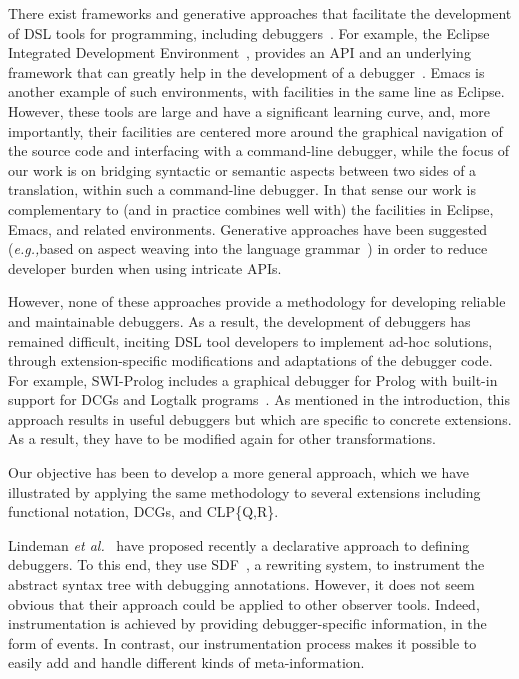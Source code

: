 \documentclass[preprint]{llncs}
\newcommand{\eg}{\emph{e.g.,\xspace}}
\begin{document}
There exist frameworks and generative approaches that facilitate the
development of DSL tools for programming, including
debuggers~\cite{eclipse,tide}. For example, the Eclipse Integrated
Development Environment~\cite{eclipse}, provides an API and an
underlying framework that can greatly help in the development of a
debugger~\cite{eclipsehowtodebug}.  Emacs 
is another example of such environments, with facilities in the same
line as
Eclipse.  However, 
these tools are large and have a significant learning curve, and, more
importantly, their facilities are centered more around the graphical
navigation of the source code and interfacing with a command-line
debugger, while the focus of our work is on bridging syntactic or
semantic aspects between two sides of a translation, within such a
command-line debugger.
In that sense our work is complementary to (and in practice combines
well with) the facilities in Eclipse, Emacs, and related environments.
Generative approaches have been suggested (\eg based on aspect weaving
into the language grammar~\cite{debugaspect05}) in order to reduce
developer burden when using intricate APIs.  

However, none of these approaches provide a methodology for developing
reliable and maintainable debuggers. As a result, the development of
debuggers has remained difficult, inciting DSL tool developers to
implement ad-hoc solutions,
through extension-specific modifications and adaptations of the
debugger code. For example, SWI-Prolog includes a graphical debugger for Prolog with built-in support for DCGs and Logtalk
programs~\cite{swipl-debug}. As mentioned in the introduction, this
approach results in useful debuggers but which are specific to
concrete extensions. As a result, they have to be modified again for
other transformations.

Our objective has been to develop a more general approach, which we
have illustrated by applying the same 
methodology to several extensions including functional notation, DCGs, 
and CLP\{Q,R\}. 



Lindeman \emph{et al.}~\cite{lindeman11} have proposed recently a
declarative approach to defining debuggers. To this end, they use
SDF~\cite{sdfasf}, a rewriting system, to instrument the abstract
syntax tree with debugging annotations. However, it does not seem
obvious that their approach could be applied to other observer
tools. Indeed, instrumentation is achieved by providing
debugger-specific information, in the form of events. In contrast, our
instrumentation process makes it possible to easily add and handle
different kinds of meta-information.
\end{document}
